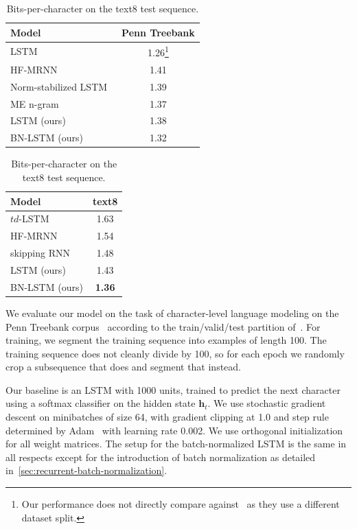 \documentclass{article} %
\newcommand{\vect}[1]{\mathbf{#1}}
\begin{document}
\begin{table}[!hb]
  \center
\begin{minipage}[t]{6.5cm}
\begin{tabular}{@{}lc@{}}
  \toprule
  \bf Model & \bf Penn Treebank \\
  \midrule
  LSTM~\cite{graves2013generating} &  1.26\footnote{Our performance does not directly compare against~\cite{graves2013generating} as they use a different dataset split.}\\
  \midrule
  HF-MRNN~\cite{mikolov2012subword} & 1.41 \\
  Norm-stabilized LSTM~\cite{krueger} & 1.39 \\
  ME n-gram~\cite{mikolov2012subword} & 1.37 \\
  \midrule
  LSTM (ours) & 1.38 \\
  BN-LSTM (ours) & 1.32 \\
  \bottomrule
\end{tabular}
\caption{Bits-per-character on the Penn Treebank test sequence.}
\label{tab:ptb_test}
\end{minipage}
\hspace{1cm}
\begin{minipage}[t]{4.5cm}
  \begin{tabular}{@{}lc@{}}
  \toprule
  \bf Model & \bf text8 \\
  \midrule
  $td$-LSTM~\cite{zhang2016architectural} & 1.63 \\
  HF-MRNN~\cite{mikolov2012subword} & 1.54 \\
  skipping RNN~\cite{pachitariu2013regularization} & 1.48 \\
  \midrule
  LSTM (ours) &  1.43 \\
  BN-LSTM (ours) & \textbf{1.36} \\
  \bottomrule
\end{tabular}
\caption{Bits-per-character on the text8 test sequence.}
\label{tab:text8_test}
\end{minipage}
\end{table}


We evaluate our model on the task of character-level language modeling on the Penn Treebank corpus~\cite{penntreebank}
according to the train/valid/test partition of~\cite{mikolov2012subword}.
For training, we segment the training sequence into examples of length 100.
The training sequence does not cleanly divide by 100, so for each epoch we randomly crop a subsequence that does and segment that instead.

Our baseline is an LSTM with 1000 units, trained to predict the next character using a softmax classifier on the hidden state $\vect{h}_t$.
We use stochastic gradient descent on minibatches of size 64,
with gradient clipping at 1.0 and step rule determined by Adam~\cite{kingma2014adam}
with learning rate 0.002.
We use orthogonal initialization for all weight matrices.
The setup for the batch-normalized LSTM is the same in all respects except for the introduction of batch normalization as detailed in~\ref{sec:recurrent-batch-normalization}.
\end{document}
